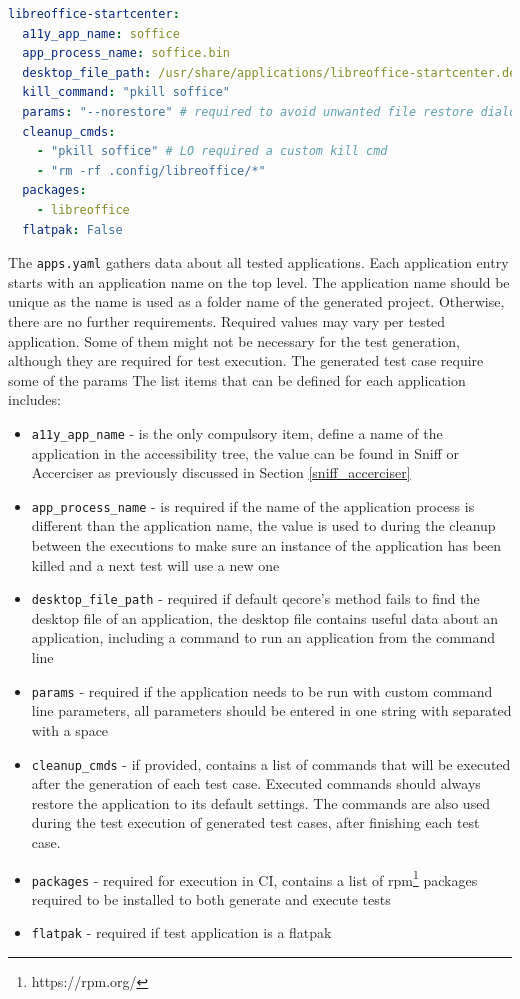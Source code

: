 \begin{lstlisting}[language=yaml,caption={Example of the apps.yaml entry for LibreOffice Start Center},label={apps.yaml}]
libreoffice-startcenter:
  a11y_app_name: soffice
  app_process_name: soffice.bin
  desktop_file_path: /usr/share/applications/libreoffice-startcenter.desktop
  kill_command: "pkill soffice"
  params: "--norestore" # required to avoid unwanted file restore dialogs
  cleanup_cmds:
    - "pkill soffice" # LO required a custom kill cmd
    - "rm -rf .config/libreoffice/*"
  packages:
    - libreoffice
  flatpak: False
\end{lstlisting}

The \texttt{apps.yaml} gathers data about all tested applications. Each application entry starts with an application name on the top level. The application name should be unique as the name is used as a folder name of the generated project. Otherwise, there are no further requirements. Required values may vary per tested application. Some of them might not be necessary for the test generation, although they are required for test execution.
The generated test case require some of the params 
The list items that can be defined for each application includes:

\begin{itemize}
    \item \texttt{a11y\_app\_name} - is the only compulsory item, define a name of the application in the accessibility tree, the value can be found in Sniff or Accerciser as previously discussed in Section \ref{sniff_accerciser}
     \item \texttt{app\_process\_name} - is required if the name of the application process is different than the application name, the value is used to during the cleanup between the executions to make sure an instance of the application has been killed and a next test will use a new one
     \item \texttt{desktop\_file\_path} - required if default qecore's method fails to find the desktop file of an application, the desktop file contains useful data about an application, including a command to run an application from the command line
     \item \texttt{params} - required if the application needs to be run with custom command line parameters, all parameters should be entered in one string with separated with a space
     \item \texttt{cleanup\_cmds} - if provided, contains a list of commands that will be executed after the generation of each test case. Executed commands should always restore the application to its default settings. The commands are also used during the test execution of generated test cases, after finishing each test case. 
     \item \texttt{packages} - required for execution in CI, contains a list of rpm\footnote{https://rpm.org/} packages required to be installed to both generate and execute tests
     \item \texttt{flatpak} - required if test application is a flatpak
\end{itemize}

